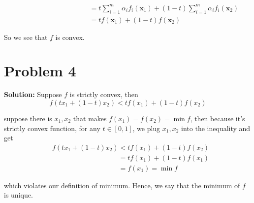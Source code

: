 \documentclass[11pt]{article}
\begin{document}
	\begin{align}
		&\phantom{f(t\mathbf{x}_1 + (1 - t)\mathbf{x}_2) = \sum_{i = 1}^m \alpha_if_i(t\mathbf{x}_1 + (1 - t)\mathbf{x}_2)}\nonumber\\
		&\phantom{f(t\mathbf{x}_1 + (1 - t)\mathbf{x}_2)} = t\sum_{i = 1}^m \alpha_if_i(\mathbf{x}_1) + (1 - t)\sum_{i = 1}^m \alpha_if_i(\mathbf{x}_2)\nonumber\\
		&\phantom{f(t\mathbf{x}_1 + (1 - t)\mathbf{x}_2)} = tf(\mathbf{x}_1) + (1 - t)f(\mathbf{x}_2)\nonumber
	\end{align}

So we see that $f$ is convex.
\section*{Problem 4}
\textbf{Solution:} 
 Suppose $f$ is strictly convex, then
 	\[f(tx_1 + (1 - t)x_2) < tf(x_1) + (1 - t)f(x_2)\]
 	
 	suppose there is $x_1, x_2$ that makes $f(x_1) = f(x_2) = \min f$, then because it's strictly convex function, for any $t \in [0, 1]$, we plug $x_1, x_2$ into the inequality and get
	\begin{align}
		&f(tx_1 + (1 - t)x_2) < tf(x_1) + (1 - t)f(x_2)\nonumber\\
		&\phantom{f(tx_1 + (1 - t)x_2)} = tf(x_1) + (1 - t)f(x_1)\nonumber\\
		&\phantom{f(tx_1 + (1 - t)x_2)} = f(x_1) = \min f\nonumber
	\end{align}
	
	which violates our definition of minimum. Hence, we say that the minimum of $f$ is unique.
\end{document}
